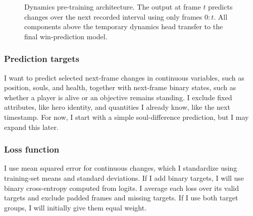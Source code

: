 \documentclass[11pt]{article}
\begin{document}
\begin{figure}[H]
    \caption{
        Dynamics pre-training architecture.
        The output at frame $t$ predicts changes over the next
        recorded interval using only frames $0{:}t$.
        All components above the temporary dynamics head
        transfer to the final win-prediction model.
    }
    \label{fig:pretrain2-architecture}
    \end{figure}
    \subsubsection{Prediction targets}
        I want to predict selected next-frame changes in continuous variables, such as position, souls, and health, together with next-frame binary states, such as whether a player is alive or an objective remains standing. I exclude fixed attributes, like hero identity, and quantities I already know, like the next timestamp. For now, I start with a simple soul-difference prediction, but I may expand this later.

    \subsubsection{Loss function}
        I use mean squared error for continuous changes, which I standardize using training-set means and standard deviations. If I add binary targets, I will use binary cross-entropy computed from logits. I average each loss over its valid targets and exclude padded frames and missing targets. If I use both target groups, I will initially give them equal weight.
\end{document}
